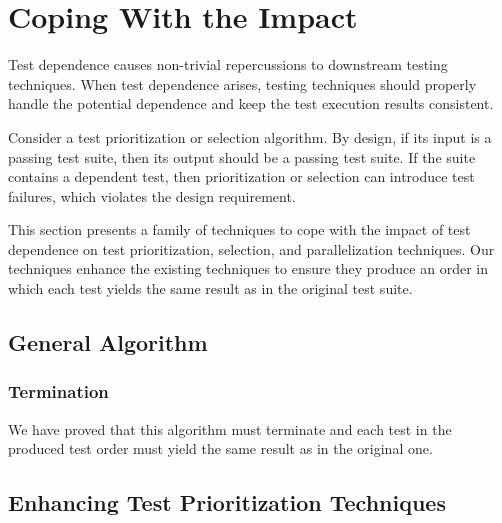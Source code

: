 \section{Coping With the Impact}
\label{sec:cope}

Test dependence causes non-trivial repercussions
to downstream testing techniques.
When test dependence arises, testing techniques
should properly handle the potential dependence 
and keep the test execution results consistent.

Consider a test prioritization
or selection algorithm. By design, if its input is a passing test
suite, then its output should be a passing test suite. If the
suite contains a dependent test, then prioritization
or selection can introduce test failures, which violates the
design requirement.


This section presents a family of techniques to cope with
the impact of test dependence on test prioritization, selection,
and parallelization techniques. 
Our techniques enhance the existing techniques to ensure
they produce an order in which each test yields the same
result as in the original test suite.

\subsection{General Algorithm}



\subsubsection{Termination}

We have proved that this algorithm must terminate and each test
in the produced test order must yield the same result as in the original
one.

\subsection{Enhancing Test Prioritization Techniques}
\label{sec:enhanceprio}

